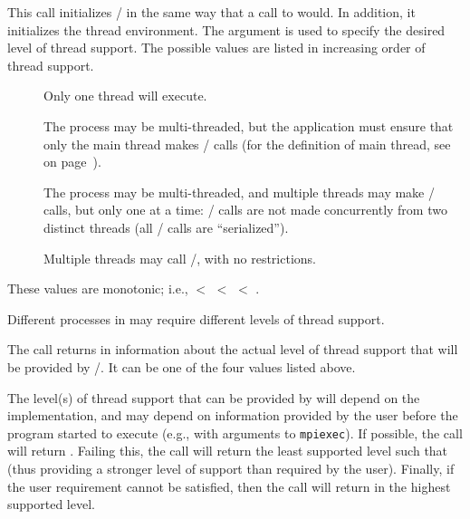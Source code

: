 This call initializes \MPI/ in the same way that a call to 
would.  In addition, it
initializes the thread environment.  The argument 
is used to specify the desired level of thread support.  
The possible values are listed  in increasing order of thread support.
\begin{description}
\item[] Only one thread will execute. 
\item[] The process may be multi-threaded, but
the application must ensure that only the main thread makes \MPI/ calls
(for the definition of main thread, see  
on page~\pageref{function:mpiisthreadmain}).
\item[] The process may be
multi-threaded, and multiple threads may make \MPI/ calls, but only
one at a time: \MPI/ calls are not made concurrently from two distinct
threads (all \MPI/ calls are ``serialized'').
\item[] Multiple threads may call \MPI/, 
with no restrictions.
\end{description}
These values are monotonic; i.e.,
  $<$ 
$<$  $<$ . 

Different processes in  may require different
levels of thread support.

The call returns in  information about the actual
level of  thread support that will be provided by \MPI/.  It can be one of the
four values listed above.   

%
%
The level(s) of thread support that can be provided by
  will
depend on the implementation, and may depend on information provided
by the user before the program started to execute (e.g., with
%
arguments to {\tt mpiexec}).    If possible, the call will return
.  Failing this, the call will return the
least supported level such that  (thus providing
a stronger level of support than required by the user).  Finally, if the user
requirement cannot be satisfied, then the call will return 
in  the highest supported level. 


